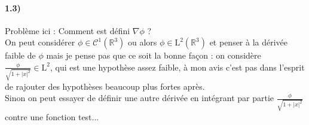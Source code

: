 \documentclass[12pt,a4paper,titlepage]{article}
\newcommand{\R}{\mathbb{R}}
\begin{document}
\paragraph{1.3)}
Problème ici : Comment est défini $\nabla \phi$ ? \\
On peut considérer $\phi \in \mathcal{C}^1(\R^3)$ ou alors $\phi \in \text{L}^2(\R^3)$ et penser à la dérivée faible de $\phi$ mais je pense pas que ce soit la bonne façon : on considère $\frac{\phi}{\sqrt{1+|x|^2}} \in \text{L}^2$, qui est une hypothèse assez faible, à mon avis c'est pas dans l'esprit de rajouter des hypothèses beaucoup plus fortes après.\\
Sinon on peut essayer de définir une autre dérivée en intégrant par partie $\frac{\phi}{\sqrt{1+|x|^2}}$ contre une fonction test...
\end{document}
